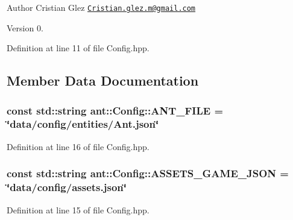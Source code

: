 \begin{DoxyAuthor}{Author}
Cristian Glez \href{mailto:Cristian.glez.m@gmail.com}{\tt Cristian.\+glez.\+m@gmail.\+com} 
\end{DoxyAuthor}
\begin{DoxyVersion}{Version}
0. 
\end{DoxyVersion}


Definition at line 11 of file Config.\+hpp.



\subsection{Member Data Documentation}
\hypertarget{classant_1_1_config_ab3a359a775f870b58cc8535aa44a6526}{
\subsubsection[{A\+N\+T\+\_\+\+F\+I\+L\+E}]{\setlength{\rightskip}{0pt plus 5cm}const std\+::string ant\+::\+Config\+::\+A\+N\+T\+\_\+\+F\+I\+L\+E = \char`\"{}data/config/entities/Ant.\+json\char`\"{}\hspace{0.3cm}{\ttfamily [static]}}}\label{classant_1_1_config_ab3a359a775f870b58cc8535aa44a6526}


Definition at line 16 of file Config.\+hpp.

\hypertarget{classant_1_1_config_a76f6edfa4ffe448ff6d874d438d59feb}{
\subsubsection[{A\+S\+S\+E\+T\+S\+\_\+\+G\+A\+M\+E\+\_\+\+J\+S\+O\+N}]{\setlength{\rightskip}{0pt plus 5cm}const std\+::string ant\+::\+Config\+::\+A\+S\+S\+E\+T\+S\+\_\+\+G\+A\+M\+E\+\_\+\+J\+S\+O\+N = \char`\"{}data/config/assets.\+json\char`\"{}\hspace{0.3cm}{\ttfamily [static]}}}\label{classant_1_1_config_a76f6edfa4ffe448ff6d874d438d59feb}


Definition at line 15 of file Config.\+hpp.

